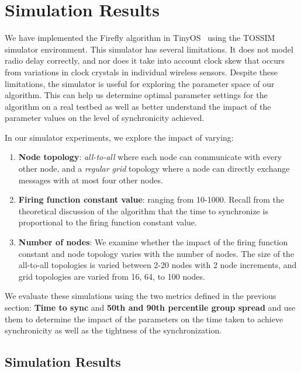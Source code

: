 \section{Simulation Results}
\label{sec-simulations}

We have implemented the Firefly algorithm in TinyOS~\cite{tinyos-asplos00} using the 
TOSSIM~\cite{tossim} simulator environment. This simulator has several limitations. 
It does not model radio delay correctly, and nor does it take into account clock
skew that occurs from variations in clock crystals in individual wireless sensors. Despite these
limitations, the simulator is useful for exploring the parameter space of our 
algorithm.  This can help us determine optimal parameter settings for the algorithm on
a real testbed as well as better understand the impact of the parameter values on the 
level of synchronicity achieved.

In our simulator experiments, we explore the impact of varying: 

\begin{enumerate}\addtolength{\itemsep}{-0.5\baselineskip}
\item {\bf Node topology}: \emph{all-to-all} where each node can communicate with every other node, 
and a \emph{regular grid} topology where a node can directly exchange messages with at most
four other nodes.
\item {\bf Firing function constant value}: ranging from 10-1000. Recall from the theoretical
discussion of the algorithm that the time to synchronize is proportional to the firing
function constant value.
\item {\bf Number of nodes}: We examine whether the impact of the firing function constant and
node topology varies with the number of nodes. The size of the all-to-all topologies
is varied between 2-20 nodes with 2 node increments, and grid topologies are varied
from 16, 64, to 100 nodes.
\end{enumerate}

We evaluate these simulations using the two metrics defined in the previous section: {\bf Time to sync}
and {\bf 50th and 90th percentile group spread} and use them to determine the impact of the parameters
on the time taken to achieve synchronicity as well as the tightness of the synchronization.  

\subsection{Simulation Results}

